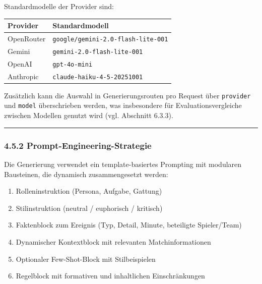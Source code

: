 Standardmodelle der Provider sind:

{\def\LTcaptype{none} %
\begin{longtable}[]{@{}ll@{}}
\toprule\noalign{}
Provider & Standardmodell \\
\midrule\noalign{}
\endhead
\bottomrule\noalign{}
\endlastfoot
OpenRouter &
\passthrough{\lstinline!google/gemini-2.0-flash-lite-001!} \\
Gemini & \passthrough{\lstinline!gemini-2.0-flash-lite-001!} \\
OpenAI & \passthrough{\lstinline!gpt-4o-mini!} \\
Anthropic & \passthrough{\lstinline!claude-haiku-4-5-20251001!} \\
\end{longtable}
}

Zusätzlich kann die Auswahl in Generierungsrouten pro Request über
\passthrough{\lstinline!provider!} und \passthrough{\lstinline!model!}
überschrieben werden, was insbesondere für Evaluationsvergleiche
zwischen Modellen genutzt wird (vgl. Abschnitt 6.3.3).

\begin{center}\rule{0.5\linewidth}{0.5pt}\end{center}

\subsubsection{4.5.2
Prompt-Engineering-Strategie}\label{prompt-engineering-strategie}

Die Generierung verwendet ein template-basiertes Prompting mit modularen
Bausteinen, die dynamisch zusammengesetzt werden:

\begin{enumerate}
\def\labelenumi{\arabic{enumi}.}
\tightlist
\item
  Rolleninstruktion (Persona, Aufgabe, Gattung)
\item
  Stilinstruktion (neutral / euphorisch / kritisch)
\item
  Faktenblock zum Ereignis (Typ, Detail, Minute, beteiligte
  Spieler/Team)
\item
  Dynamischer Kontextblock mit relevanten Matchinformationen
\item
  Optionaler Few-Shot-Block mit Stilbeispielen
\item
  Regelblock mit formativen und inhaltlichen Einschränkungen
\end{enumerate}

